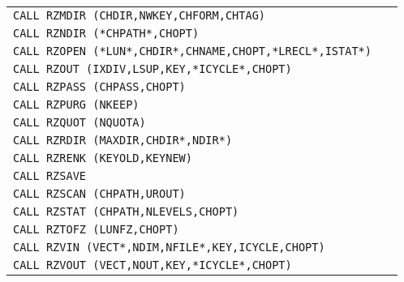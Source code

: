 \begin{Tabhere}
\begin{center}
\begin{tabular}{|>{\tt}l@{\quad}r|}
CALL RZMDIR (CHDIR,NWKEY,CHFORM,CHTAG)                   & \pageref{RZMDIR} \\
CALL RZNDIR (*CHPATH*,CHOPT)                             & \pageref{RZNDIR} \\
CALL RZOPEN (*LUN*,CHDIR*,CHNAME,CHOPT,*LRECL*,ISTAT*)   & \pageref{RZOPEN} \\
CALL RZOUT (IXDIV,LSUP,KEY,*ICYCLE*,CHOPT)               & \pageref{RZOUT}  \\
CALL RZPASS (CHPASS,CHOPT)                               & \pageref{RZPASS} \\
CALL RZPURG (NKEEP)                                      & \pageref{RZPURG} \\
CALL RZQUOT (NQUOTA)                                     & \pageref{RZQUOT} \\
CALL RZRDIR (MAXDIR,CHDIR*,NDIR*)                        & \pageref{RZRDIR} \\
CALL RZRENK (KEYOLD,KEYNEW)                              & \pageref{RZRENK} \\
CALL RZSAVE                                              & \pageref{RZSAVE} \\
CALL RZSCAN (CHPATH,UROUT)                               & \pageref{RZSCAN} \\
CALL RZSTAT (CHPATH,NLEVELS,CHOPT)                       & \pageref{RZSTAT} \\
CALL RZTOFZ (LUNFZ,CHOPT)                                & \pageref{RZTOFZ} \\
CALL RZVIN (VECT*,NDIM,NFILE*,KEY,ICYCLE,CHOPT)          & \pageref{RZVIN}  \\
CALL RZVOUT (VECT,NOUT,KEY,*ICYCLE*,CHOPT)               & \pageref{RZVOUT} \\
\hline
\end{tabular}
\end{center}
\end{Tabhere}

